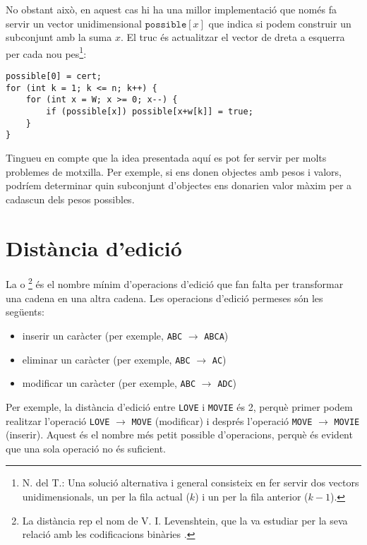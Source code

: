 No obstant això, en aquest cas
hi ha una millor implementació que només fa servir
un vector unidimensional $\texttt{possible}[x]$
que indica si podem construir un subconjunt amb la suma $x$.
El truc és actualitzar el vector de dreta a esquerra
per cada nou pes\footnote{N. del T.: Una solució alternativa i general consisteix
en fer servir dos vectors unidimensionals, un per la fila actual ($k$) i un per la
fila anterior ($k-1$).}:
\begin{lstlisting}
possible[0] = cert;
for (int k = 1; k <= n; k++) {
    for (int x = W; x >= 0; x--) {
        if (possible[x]) possible[x+w[k]] = true;
    }
}
\end{lstlisting}

Tingueu en compte que la idea presentada aquí es pot fer servir per
molts problemes de motxilla.
Per exemple, si ens donen objectes amb pesos i valors,
podríem determinar quin subconjunt d'objectes ens donarien valor màxim
per a cadascun dels pesos possibles.

\section{Distància d'edició}


La  o \footnote{La distància
rep el nom de V. I. Levenshtein, que la va estudiar per la seva relació amb les
codificacions binàries \cite{lev66}.}
és el nombre mínim d'operacions d'edició
que fan falta per transformar una cadena
en una altra cadena.
Les operacions d'edició permeses són les següents:
\begin{itemize}
\item inserir un caràcter (per exemple, \texttt{ABC} $\rightarrow$ \texttt{ABCA})
\item eliminar un caràcter (per exemple, \texttt{ABC} $\rightarrow$ \texttt{AC})
\item modificar un caràcter (per exemple, \texttt{ABC} $\rightarrow$ \texttt{ADC})
\end{itemize}

Per exemple, la distància d'edició entre
\texttt{LOVE} i \texttt{MOVIE} és 2,
perquè primer podem realitzar l'operació
 \texttt{LOVE} $\rightarrow$ \texttt{MOVE}
(modificar) i després l'operació
\texttt{MOVE} $\rightarrow$ \texttt{MOVIE}
(inserir).
Aquest és el nombre més petit possible d'operacions,
perquè és evident que una sola operació no és suficient.

